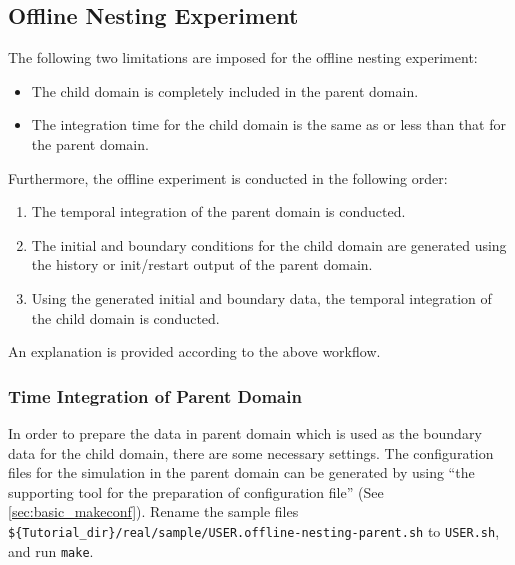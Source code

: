\subsection{Offline Nesting Experiment} \label{subsec:nest_offline}

The following two limitations are imposed for the offline nesting experiment:
\begin{itemize}
 \item The child domain is completely included in the parent domain.
 \item The integration time for the child domain is the same as or less than that for the parent domain.
\end{itemize}
Furthermore, the offline experiment is conducted in the following order:
\begin{enumerate}
 \item The temporal integration of the parent domain is conducted.
 \item The initial and boundary conditions for the child domain are generated using the history or init/restart output of the parent domain.
 \item Using the generated initial and boundary data, the temporal integration of the child domain is conducted.
\end{enumerate}
An explanation is provided according to the above workflow.


\subsubsection{Time Integration of Parent Domain}

In order to prepare the data in parent domain which is used as the boundary data for the child domain, there are some necessary settings.
The configuration files for the simulation in the parent domain can be generated by using ``the supporting tool for the preparation of configuration file'' (See \ref{sec:basic_makeconf}).
Rename the sample files \\ \verb|${Tutorial_dir}/real/sample/USER.offline-nesting-parent.sh| to \verb|USER.sh|, and run \verb|make|.

